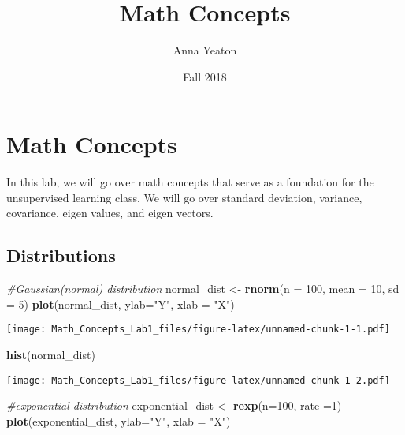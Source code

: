 \documentclass[11pt,]{article}
\title{Math Concepts}
\author{Anna Yeaton}
\date{Fall 2018}
\newenvironment{Shaded}{\begin{snugshade}}{\end{snugshade}}
\newcommand{\KeywordTok}[1]{\textcolor[rgb]{0.13,0.29,0.53}{\textbf{#1}}}
\newcommand{\DataTypeTok}[1]{\textcolor[rgb]{0.13,0.29,0.53}{#1}}
\newcommand{\DecValTok}[1]{\textcolor[rgb]{0.00,0.00,0.81}{#1}}
\newcommand{\StringTok}[1]{\textcolor[rgb]{0.31,0.60,0.02}{#1}}
\newcommand{\CommentTok}[1]{\textcolor[rgb]{0.56,0.35,0.01}{\textit{#1}}}
\newcommand{\NormalTok}[1]{#1}
\begin{document}
\maketitle

\section{Math Concepts}\label{math-concepts}

In this lab, we will go over math concepts that serve as a foundation
for the unsupervised learning class. We will go over standard deviation,
variance, covariance, eigen values, and eigen vectors.

\subsection{Distributions}\label{distributions}

\begin{Shaded}
\begin{Highlighting}[]
\CommentTok{#Gaussian(normal) distribution}
\NormalTok{normal_dist <-}\StringTok{ }\KeywordTok{rnorm}\NormalTok{(}\DataTypeTok{n =} \DecValTok{100}\NormalTok{, }\DataTypeTok{mean =} \DecValTok{10}\NormalTok{, }\DataTypeTok{sd =} \DecValTok{5}\NormalTok{)}
\KeywordTok{plot}\NormalTok{(normal_dist, }\DataTypeTok{ylab=}\StringTok{"Y"}\NormalTok{, }\DataTypeTok{xlab =} \StringTok{"X"}\NormalTok{)}
\end{Highlighting}
\end{Shaded}

\texttt{[image: Math\_Concepts\_Lab1\_files/figure-latex/unnamed-chunk-1-1.pdf]}

\begin{Shaded}
\begin{Highlighting}[]
\KeywordTok{hist}\NormalTok{(normal_dist)}
\end{Highlighting}
\end{Shaded}

\texttt{[image: Math\_Concepts\_Lab1\_files/figure-latex/unnamed-chunk-1-2.pdf]}

\begin{Shaded}
\begin{Highlighting}[]
\CommentTok{#exponential distribution}
\NormalTok{exponential_dist <-}\StringTok{ }\KeywordTok{rexp}\NormalTok{(}\DataTypeTok{n=}\DecValTok{100}\NormalTok{, }\DataTypeTok{rate =}\DecValTok{1}\NormalTok{)}
\KeywordTok{plot}\NormalTok{(exponential_dist, }\DataTypeTok{ylab=}\StringTok{"Y"}\NormalTok{, }\DataTypeTok{xlab =} \StringTok{"X"}\NormalTok{)}
\end{Highlighting}
\end{Shaded}
\end{document}
